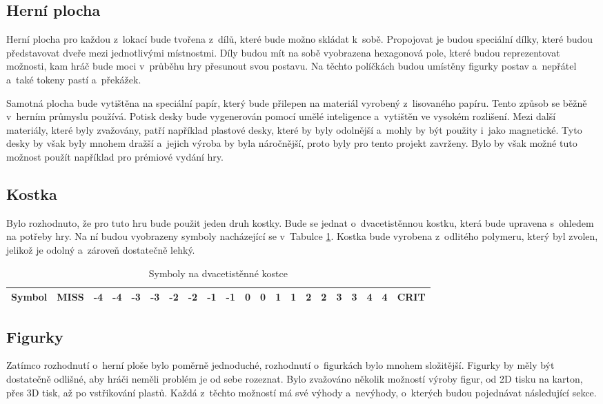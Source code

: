 \subsection{Herní plocha}
Herní plocha pro každou z~lokací bude tvořena z~dílů, které bude možno skládat k~sobě. Propojovat je budou speciální dílky, které budou představovat dveře mezi jednotlivými místnostmi. Díly budou mít na sobě vyobrazena hexagonová pole, které budou reprezentovat možnosti, kam hráč bude moci v~průběhu hry přesunout svou postavu. Na těchto políčkách budou umístěny figurky postav a~nepřátel a~také tokeny pastí a~překážek.

Samotná plocha bude vytištěna na speciální papír, který bude přilepen na materiál vyrobený z~lisovaného papíru. Tento způsob se běžně v~herním průmyslu používá. Potisk desky bude vygenerován pomocí umělé inteligence a~vytištěn ve vysokém rozlišení. Mezi další materiály, které byly zvažovány, patří například plastové desky, které by byly odolnější a~mohly by být použity i~jako magnetické. Tyto desky by však byly mnohem dražší a~jejich výroba by byla náročnější, proto byly pro tento projekt zavrženy. Bylo by však možné tuto možnost použít například pro prémiové vydání hry.

\subsection{Kostka}
Bylo rozhodnuto, že pro tuto hru bude použit jeden druh kostky. Bude se jednat o~dvacetistěnnou kostku, která bude upravena s~ohledem na potřeby hry. Na ní budou vyobrazeny symboly nacházející se v~Tabulce \ref{tab:dice_symbols}. Kostka bude vyrobena z~odlitého polymeru, který byl zvolen, jelikož je odolný a~zároveň dostatečně lehký.

\begin{table}[H]
    \centering
    \begin{tabular}{*{21}{c}}
        \toprule
        \multicolumn{1}{c|}{\textbf{Symbol}} & MISS & -4 & -4 & -3 & -3 & -2 & -2 & -1 & -1 & 0 & 0 & 1 & 1 & 2 & 2 & 3 & 3 & 4 & 4 & CRIT \\
        \bottomrule
    \end{tabular}
    \caption{Symboly na dvacetistěnné kostce}
    \label{tab:dice_symbols}
\end{table}

\subsection{Figurky}
Zatímco rozhodnutí o~herní ploše bylo poměrně jednoduché, rozhodnutí o~figurkách bylo mnohem složitější. Figurky by měly být dostatečně odlišné, aby hráči neměli problém je od sebe rozeznat. Bylo zvažováno několik možností výroby figur, od 2D tisku na karton, přes 3D tisk, až po vstřikování plastů. Každá z~těchto možností má své výhody a~nevýhody, o~kterých budou pojednávat následující sekce.

